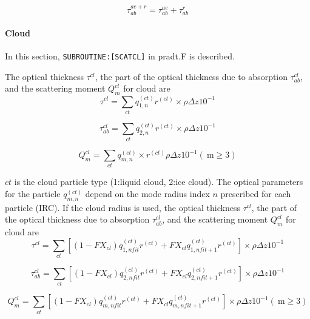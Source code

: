 \begin{equation}
\tau_{ab}^{a e+r}=\tau_{ab}^{a e}+\tau_{ab}^{r}
\end{equation}

\hypertarget{cloud}{%
\paragraph{Cloud}\label{cloud}}

In this section, \texttt{SUBROUTINE:{[}SCATCL{]}} in pradt.F is
described.

The optical thickness \(\tau^{cl}\), the part of the optical thickness
due to absorption \(\tau_{ab}^{cl}\), and the scattering moment
\(Q_{m}^{c l}\) for cloud are \begin{equation}
\tau^{c l}=\sum_{c t} q_{1, n}^{(c t)}r^{(c t)}\times \rho \Delta z 10^{-1}
\end{equation}

\begin{equation}
\tau_{ab}^{c l}=\sum_{c t} q_{2, n}^{(c t)}r^{(c t)}\times \rho \Delta z 10^{-1}
\end{equation}

\begin{equation}
Q_{m}^{c l}=\sum_{c t} q_{m, n}^{(c t)} \times r^{(c t)} \rho \Delta z 10^{-1}(\mathrm{~m} \geq 3)
\end{equation}

\(ct\) is the cloud particle type (1:liquid cloud, 2:ice cloud). The
optical parameters for the particle \(q_{m, n}^{(c t)}\) depend on the
mode radius index \(n\) prescribed for each particle (IRC). If the cloud
radius is used, the optical thickness \(\tau^{cl}\), the part of the
optical thickness due to absorption \(\tau_{ab}^{cl}\), and the
scattering moment \(Q_{m}^{c l}\) for cloud are \begin{equation}
\tau^{c l}=\sum_{c t}\left[\left(1-F X_{c l}\right) q_{1, n f i t}^{(c t)} r^{(c t)}+F X_{c l} q_{1, n f i t+1}^{(c t)} r^{(c t)}\right] \times \rho \Delta z 10^{-1}
\end{equation}

\begin{equation}
\tau_{ab}^{c l}=\sum_{c t}\left[\left(1-F X_{c l}\right) q_{2, n f i t}^{(c t)} r^{(c t)}+F X_{c l} q_{2, n f i t+1}^{(c t)} r^{(c t)}\right] \times \rho \Delta z 10^{-1}
\end{equation}

\begin{equation}
Q_{m}^{c l}=\sum_{c t}\left[\left(1-F X_{c l}\right) q_{m, n f i t}^{(c t)} r^{(c t)}+F X_{c l} q_{m, n f i t+1}^{(c t)} r^{(c t)}\right] \times \rho \Delta z 10^{-1}(\mathrm{~m} \geq 3)
\end{equation}

